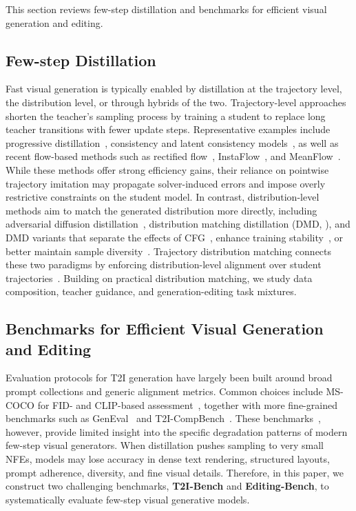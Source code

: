\documentclass{llmxive}
\begin{document}
This section reviews few-step distillation and benchmarks for efficient visual generation and editing.




\subsection{Few-step Distillation}
Fast visual generation is typically enabled by distillation at the trajectory level, the distribution level, or through hybrids of the two. Trajectory-level approaches shorten the teacher's sampling process by training a student to replace long teacher transitions with fewer update steps. Representative examples include progressive distillation~\citep{salimans2022progressive}, consistency and latent consistency models~\citep{song2023consistency, luo2023latent}, as well as recent flow-based methods such as rectified flow~\citep{liu2023flow}, InstaFlow~\citep{liu2023instaflow}, and MeanFlow~\citep{geng2025mean}. While these methods offer strong efficiency gains, their reliance on pointwise trajectory imitation may propagate solver-induced errors and impose overly restrictive constraints on the student model. In contrast, distribution-level methods aim to match the generated distribution more directly, including adversarial diffusion distillation~\citep{sauer2024adversarial}, distribution matching distillation (DMD, \citealt{yin2024improved,yin2024one}), and DMD variants that separate the effects of CFG~\citep{liu2025decoupled}, enhance training stability~\citep{bai2026optimizing}, or better maintain sample diversity~\citep{wu2026diversity}. Trajectory distribution matching connects these two paradigms by enforcing distribution-level alignment over student trajectories~\citep{luo2026tdm}. Building on practical distribution matching, we study data composition, teacher guidance, and generation-editing task mixtures.




\subsection{Benchmarks for Efficient Visual Generation and Editing}
Evaluation protocols for T2I generation have largely been built around broad prompt collections and generic alignment metrics. Common choices include MS-COCO for FID- and CLIP-based assessment~\citep{lin2014microsoft}, together with more fine-grained benchmarks such as GenEval~\citep{ghosh2023geneval} and T2I-CompBench~\citep{huang2023t2icompbench}. These benchmarks~\citep{ghosh2023geneval, huang2023t2icompbench, lin2014microsoft, wei2025tiif}, however, provide limited insight into the specific degradation patterns of modern few-step visual generators. When distillation pushes sampling to very small NFEs, models may lose accuracy in dense text rendering, structured layouts, prompt adherence, diversity, and fine visual details. Therefore, in this paper, we construct two challenging benchmarks, \textbf{T2I-Bench} and \textbf{Editing-Bench}, to systematically evaluate few-step visual generative models.
\end{document}
